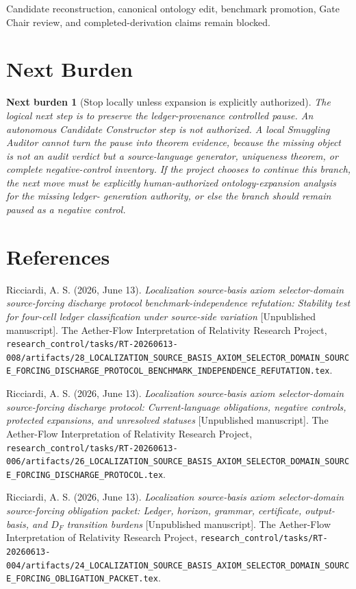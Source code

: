 \documentclass[11pt]{article}
\newtheorem{nextburden}{Next burden}
\begin{document}
Candidate reconstruction, canonical ontology edit, benchmark promotion,
Gate Chair review, and completed-derivation claims remain blocked.

\section{Next Burden}

\begin{nextburden}[Stop locally unless expansion is explicitly authorized]
The logical next step is to preserve the ledger-provenance controlled pause.
An autonomous Candidate Constructor step is not authorized. A local
Smuggling Auditor cannot turn the pause into theorem evidence, because the
missing object is not an audit verdict but a source-language generator,
uniqueness theorem, or complete negative-control inventory. If the project
chooses to continue this branch, the next move must be explicitly
human-authorized ontology-expansion analysis for the missing ledger-
generation authority, or else the branch should remain paused as a negative
control.
\end{nextburden}

\section*{References}

Ricciardi, A. S. (2026, June 13). \emph{Localization source-basis axiom
selector-domain source-forcing discharge protocol benchmark-independence
refutation: Stability test for four-cell ledger classification under
source-side variation} [Unpublished manuscript]. The Aether-Flow
Interpretation of Relativity Research Project,
\texttt{research\_control/tasks/RT-20260613-008/artifacts/28\_LOCALIZATION\_SOURCE\_BASIS\_AXIOM\_SELECTOR\_DOMAIN\_SOURCE\_FORCING\_DISCHARGE\_PROTOCOL\_BENCHMARK\_INDEPENDENCE\_REFUTATION.tex}.

Ricciardi, A. S. (2026, June 13). \emph{Localization source-basis axiom
selector-domain source-forcing discharge protocol: Current-language
obligations, negative controls, protected expansions, and unresolved
statuses} [Unpublished manuscript]. The Aether-Flow Interpretation of
Relativity Research Project,
\texttt{research\_control/tasks/RT-20260613-006/artifacts/26\_LOCALIZATION\_SOURCE\_BASIS\_AXIOM\_SELECTOR\_DOMAIN\_SOURCE\_FORCING\_DISCHARGE\_PROTOCOL.tex}.

Ricciardi, A. S. (2026, June 13). \emph{Localization source-basis axiom
selector-domain source-forcing obligation packet: Ledger, horizon, grammar,
certificate, output-basis, and \(D_F\) transition burdens} [Unpublished
manuscript]. The Aether-Flow Interpretation of Relativity Research Project,
\texttt{research\_control/tasks/RT-20260613-004/artifacts/24\_LOCALIZATION\_SOURCE\_BASIS\_AXIOM\_SELECTOR\_DOMAIN\_SOURCE\_FORCING\_OBLIGATION\_PACKET.tex}.
\end{document}
